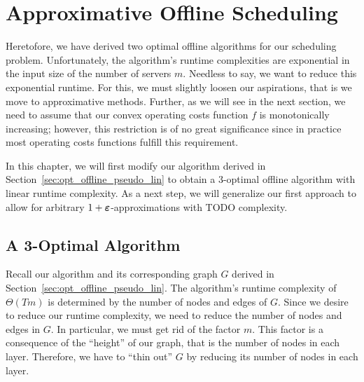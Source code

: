 
\chapter{Approximative Offline Scheduling}
Heretofore, we have derived two optimal offline algorithms for our scheduling problem. Unfortunately, the algorithm's runtime complexities are exponential in the input size of the number of servers $m$. Needless to say, we want to reduce this exponential runtime. For this, we must slightly loosen our aspirations, that is we move to approximative methods. Further, as we will see in the next section, we need to assume that our convex operating costs function $f$ is monotonically increasing; however, this restriction is of no great significance since in practice most operating costs functions fulfill this requirement. 

In this chapter, we will first modify our algorithm derived in Section~\ref{sec:opt_offline_pseudo_lin} to obtain a 3-optimal offline algorithm with linear runtime complexity. As a next step, we will generalize our first approach to allow for arbitrary $1+\boldsymbol\varepsilon$-approximations with TODO complexity.

\section{A 3-Optimal Algorithm}
Recall our algorithm and its corresponding graph $G$ derived in Section~\ref{sec:opt_offline_pseudo_lin}. The algorithm's runtime complexity of $\Theta(Tm)$ is determined by the number of nodes and edges of $G$. Since we desire to reduce our runtime complexity, we need to reduce the number of nodes and edges in $G$. In particular, we must get rid of the factor $m$. This factor is a consequence of the ``height'' of our graph, that is the number of nodes in each layer. Therefore, we have to ``thin out'' $G$ by reducing its number of nodes in each layer.

